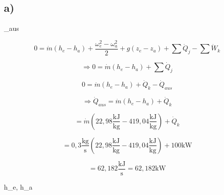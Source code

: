 

\subsection*{a)}

 \quad {}_{aus}

\[
0 = \dot{m} (h_e - h_a) + \frac{\omega_e^2 - \omega_a^2}{2} + g(z_e - z_a) + \sum \dot{Q}_j - \sum \dot{W}_k
\]

\[
\Rightarrow 0 = \dot{m} (h_e - h_a) + \sum \dot{Q}_j
\]

\[
0 = \dot{m} (h_e - h_a) + \dot{Q}_k - \dot{Q}_{aus}
\]

\[
\Rightarrow \dot{Q}_{aus} = \dot{m} (h_e - h_a) + \dot{Q}_k
\]

\[
= \dot{m} (22,98 \frac{\text{kJ}}{\text{kg}} - 419,04 \frac{\text{kJ}}{\text{kg}}) + \dot{Q}_k
\]

\[
= 0,3 \frac{\text{kg}}{\text{s}} (22,98 \frac{\text{kJ}}{\text{kg}} - 419,04 \frac{\text{kJ}}{\text{kg}}) + 100 \text{kW}
\]

\[
= 62,182 \frac{\text{kJ}}{\text{s}} = 62,182 \text{kW}
\]

 h_e, h_a 